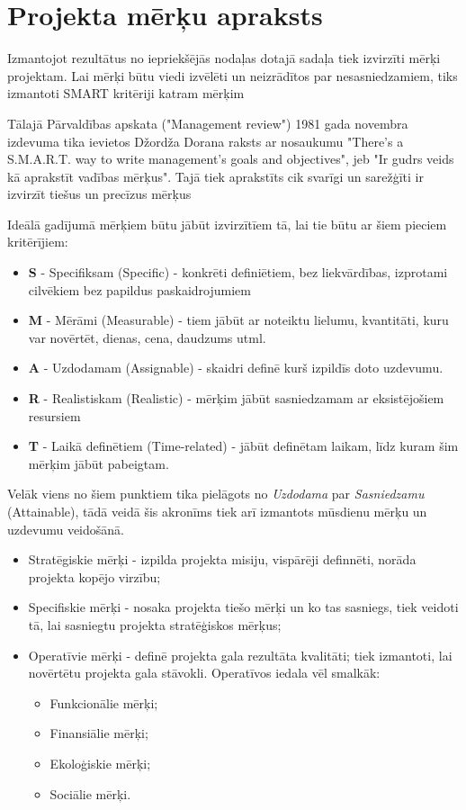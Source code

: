 \section{Projekta mērķu apraksts}
Izmantojot rezultātus no iepriekšējās nodaļas dotajā sadaļa tiek izvirzīti mērķi projektam.
Lai mērķi būtu viedi izvēlēti un neizrādītos par nesasniedzamiem, tiks izmantoti SMART 
kritēriji katram mērķim
\par
Tālajā Pārvaldības apskata ("Management review") 1981 gada novembra izdevuma tika ievietos Džordža Dorana raksts
ar nosaukumu "There's a S.M.A.R.T. way to write management's goals and objectives", jeb "Ir gudrs veids kā aprakstīt
vadības mērķus". Tajā tiek aprakstīts cik svarīgi un sarežģīti ir izvirzīt tiešus un precīzus mērķus

Ideālā gadījumā mērķiem būtu jābūt izvirzītīem tā, lai tie būtu ar šiem pieciem kritērījiem:
\begin{itemize}
    \item \textbf{S} - Specifiksam (Specific) - konkrēti definiētiem, bez liekvārdības, izprotami cilvēkiem bez papildus paskaidrojumiem
    \item \textbf{M} - Mērāmi (Measurable) - tiem jābūt ar noteiktu lielumu, kvantitāti, kuru var novērtēt, dienas, cena, daudzums utml.
    \item \textbf{A} - Uzdodamam (Assignable) - skaidri definē kurš izpildīs doto uzdevumu.
    \item \textbf{R} - Realistiskam (Realistic) - mērķim jābūt sasniedzamam ar eksistējošiem resursiem
    \item \textbf{T} - Laikā definētiem (Time-related) - jābūt definētam laikam, līdz kuram šim mērķim jābūt pabeigtam.
\end{itemize}
Velāk viens no šiem punktiem tika pielāgots no \textit{Uzdodama} par \textit{Sasniedzamu} (Attainable), tādā veidā šis
akronīms tiek arī izmantots mūsdienu mērķu un uzdevumu veidošānā.
\par
\begin{itemize}
    \item Stratēgiskie mērķi - izpilda projekta misiju, vispārēji definnēti, norāda projekta kopējo virzību;
    \item Specifiskie mērķi - nosaka projekta tiešo mērķi un ko tas sasniegs, tiek veidoti tā, lai sasniegtu projekta stratēģiskos mērķus;
    \item Operatīvie mērķi - definē projekta gala rezultāta kvalitāti; tiek izmantoti, lai novērtētu projekta gala stāvokli. Operatīvos iedala vēl smalkāk:
    \begin{itemize}
        \item Funkcionālie mērķi;
        \item Finansiālie mērķi;
        \item Ekoloģiskie mērķi;
        \item Sociālie mērķi.
    \end{itemize}
\end{itemize}
